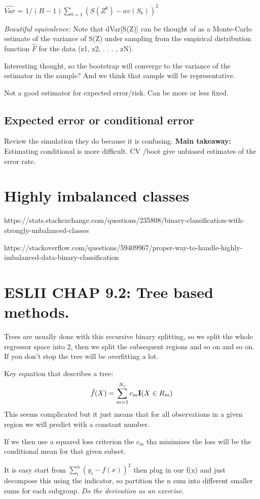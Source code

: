 \documentclass{article}
\begin{document}
$\hat{Var}$ = $1/(B-1)\sum_{b=1}(S(Z^b)-av(S_b))^2$

\textit{Beautiful equivalence: }Note that dVar[S(Z)] can be thought of as a
Monte-Carlo estimate of the variance of S(Z) under sampling from the
empirical distribution function  $\hat{F}$ for the data (z1, z2, . . . , zN). 

Interesting thought, so the bootstrap will converge to the variance of the estimator in the sample? And we think that sample will be representative.

Not a good estimator for expected error/risk. Can be more or less fixed.

\subsection{Expected error or conditional error}

Review the simulation they do because it is confusing. 
\textbf{Main takeaway:} Estimating conditional is more difficult. CV /boot give unbiased estimates of the error rate.



\section{Highly imbalanced classes}
https://stats.stackexchange.com/questions/235808/binary-classification-with-strongly-unbalanced-classes

https://stackoverflow.com/questions/59409967/proper-way-to-handle-highly-imbalanced-data-binary-classification

\section{ESLII CHAP 9.2: Tree based methods.}
Trees are usually done with this recursive binary splitting, so we split the whole regressor space into 2, then we split the subsequent regions and so on and so on. If you don't stop the tree will be overfitting a lot.

Key equation that describes a tree: 
$$\hat{f}(X) = \sum_{m=1}^{N_r} c_m \textrm{\textbf{I}}(X \in R_m)$$
This seems complicated but it just means that for all observations in a given region we will predict with a constant number.

If we then use a squared loss criterion the $c_m$ tha minimizes the loss will be the conditional mean for that given subset.

It is easy start from $\sum_i^n(y_i -f(x))^2$ then plug in our f(x) and just decompose this using the indicator, so partition the n sum into different smaller sums for each subgroup.
\textit{Do the derivation as an exercise.}
\end{document}

